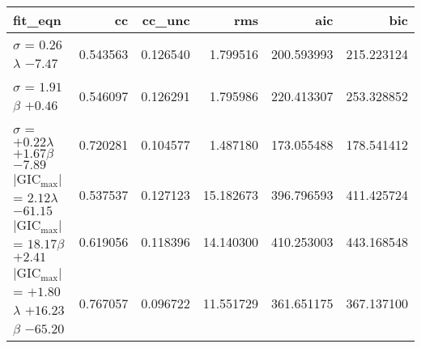 \begin{tabular}{lrrrrr}
\toprule
fit_eqn & cc & cc_unc & rms & aic & bic \\
\midrule
$\sigma$ = $0.26$$\lambda$ $-7.47$ & 0.543563 & 0.126540 & 1.799516 & 200.593993 & 215.223124 \\
$\sigma$ = $1.91$$\beta$ $+0.46$ & 0.546097 & 0.126291 & 1.795986 & 220.413307 & 253.328852 \\
$\sigma$ = $+0.22$$\lambda$ $+1.67$$\beta$ $-7.89$ & 0.720281 & 0.104577 & 1.487180 & 173.055488 & 178.541412 \\
$\vert{\text{GIC}_\text{max}}\vert$ = $2.12$$\lambda$ $-61.15$ & 0.537537 & 0.127123 & 15.182673 & 396.796593 & 411.425724 \\
$\vert{\text{GIC}_\text{max}}\vert$ = $18.17$$\beta$ $+2.41$ & 0.619056 & 0.118396 & 14.140300 & 410.253003 & 443.168548 \\
$\vert{\text{GIC}_\text{max}}\vert$ = $+1.80$$\lambda$ $+16.23$$\beta$ $-65.20$ & 0.767057 & 0.096722 & 11.551729 & 361.651175 & 367.137100 \\
\bottomrule
\end{tabular}
